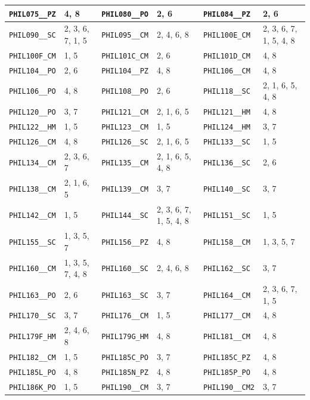 \begin{longtable}{|l|l||l|l||l|l|}
    \verb|PHIL075__PZ| & 4, 8 & \verb|PHIL080__PO| & 2, 6 & \verb|PHIL084__PZ| & 2, 6\\\hline
    \verb|PHIL090__SC| & 2, 3, 6, 7, 1, 5 & \verb|PHIL095__CM| & 2, 4, 6, 8 & \verb|PHIL100E_CM| & 2, 3, 6, 7, 1, 5, 4, 8\\\hline
    \verb|PHIL100F_CM| & 1, 5 & \verb|PHIL101C_CM| & 2, 6 & \verb|PHIL101D_CM| & 4, 8\\\hline
    \verb|PHIL104__PO| & 2, 6 & \verb|PHIL104__PZ| & 4, 8 & \verb|PHIL106__CM| & 4, 8\\\hline
    \verb|PHIL106__PO| & 4, 8 & \verb|PHIL108__PO| & 2, 6 & \verb|PHIL118__SC| & 2, 1, 6, 5, 4, 8\\\hline
    \verb|PHIL120__PO| & 3, 7 & \verb|PHIL121__CM| & 2, 1, 6, 5 & \verb|PHIL121__HM| & 4, 8\\\hline
    \verb|PHIL122__HM| & 1, 5 & \verb|PHIL123__CM| & 1, 5 & \verb|PHIL124__HM| & 3, 7\\\hline
    \verb|PHIL126__CM| & 4, 8 & \verb|PHIL126__SC| & 2, 1, 6, 5 & \verb|PHIL133__SC| & 1, 5\\\hline
    \verb|PHIL134__CM| & 2, 3, 6, 7 & \verb|PHIL135__CM| & 2, 1, 6, 5, 4, 8 & \verb|PHIL136__SC| & 2, 6\\\hline
    \verb|PHIL138__CM| & 2, 1, 6, 5 & \verb|PHIL139__CM| & 3, 7 & \verb|PHIL140__SC| & 3, 7\\\hline
    \verb|PHIL142__CM| & 1, 5 & \verb|PHIL144__SC| & 2, 3, 6, 7, 1, 5, 4, 8 & \verb|PHIL151__SC| & 1, 5\\\hline
    \verb|PHIL155__SC| & 1, 3, 5, 7 & \verb|PHIL156__PZ| & 4, 8 & \verb|PHIL158__CM| & 1, 3, 5, 7\\\hline
    \verb|PHIL160__CM| & 1, 3, 5, 7, 4, 8 & \verb|PHIL160__SC| & 2, 4, 6, 8 & \verb|PHIL162__SC| & 3, 7\\\hline
    \verb|PHIL163__PO| & 2, 6 & \verb|PHIL163__SC| & 3, 7 & \verb|PHIL164__CM| & 2, 3, 6, 7, 1, 5\\\hline
    \verb|PHIL170__SC| & 3, 7 & \verb|PHIL176__CM| & 1, 5 & \verb|PHIL177__CM| & 4, 8\\\hline
    \verb|PHIL179F_HM| & 2, 4, 6, 8 & \verb|PHIL179G_HM| & 4, 8 & \verb|PHIL181__CM| & 4, 8\\\hline
    \verb|PHIL182__CM| & 1, 5 & \verb|PHIL185C_PO| & 3, 7 & \verb|PHIL185C_PZ| & 4, 8\\\hline
    \verb|PHIL185L_PO| & 4, 8 & \verb|PHIL185N_PZ| & 4, 8 & \verb|PHIL185P_PO| & 4, 8\\\hline
    \verb|PHIL186K_PO| & 1, 5 & \verb|PHIL190__CM| & 3, 7 & \verb|PHIL190__CM2| & 3, 7\\\hline

\end{longtable}
